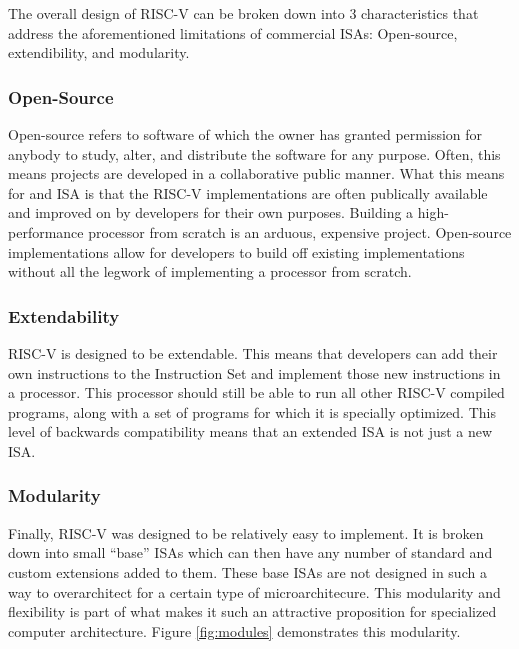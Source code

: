     

    The overall design of RISC-V can be broken down into 3 characteristics that address the aforementioned limitations of commercial \glspl{ISA}: Open-source, extendibility, and modularity.

    \subsubsection{Open-Source}
        Open-source refers to software of which the owner has granted permission for anybody to study, alter, and distribute the software for any purpose. Often, this means projects are developed in a collaborative public manner. What this means for and ISA is that the RISC-V implementations are often publically available and improved on by developers for their own purposes. Building a high-performance processor from scratch is an arduous, expensive project. Open-source implementations allow for developers to build off existing implementations without all the legwork of implementing a processor from scratch.

    \subsubsection{Extendability}
        RISC-V is designed to be extendable. This means that developers can add their own instructions to the Instruction Set and implement those new instructions in a processor. This processor should still be able to run all other RISC-V compiled programs, along with a set of programs for which it is specially optimized. This level of backwards compatibility means that an extended ISA is not just a new ISA. 

    \subsubsection{Modularity}
        Finally, RISC-V was designed to be relatively easy to implement. It is broken down into small ``base'' \glspl{ISA} which can then have any number of standard and custom extensions added to them. These base ISAs are not designed in such a way to overarchitect for a certain type of microarchitecure. This modularity and flexibility is part of what makes it such an attractive proposition for specialized computer architecture. Figure \ref{fig:modules} demonstrates this modularity.

        

